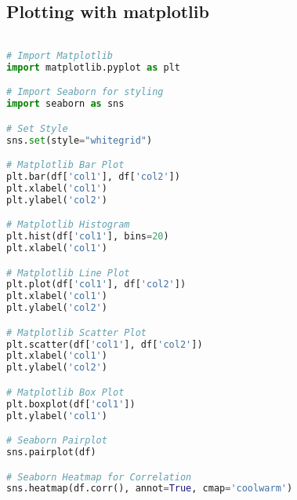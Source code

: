 \documentclass[english, threecolumn]{latex4ei/latex4ei_sheet}
\begin{document}
\begin{sectionbox}
\subsection{Plotting with matplotlib}
\begin{lstlisting}[language=Python, gobble=0]

# Import Matplotlib
import matplotlib.pyplot as plt

# Import Seaborn for styling
import seaborn as sns

# Set Style
sns.set(style="whitegrid")

# Matplotlib Bar Plot
plt.bar(df['col1'], df['col2'])
plt.xlabel('col1')
plt.ylabel('col2')

# Matplotlib Histogram
plt.hist(df['col1'], bins=20)
plt.xlabel('col1')

# Matplotlib Line Plot
plt.plot(df['col1'], df['col2'])
plt.xlabel('col1')
plt.ylabel('col2')

# Matplotlib Scatter Plot
plt.scatter(df['col1'], df['col2'])
plt.xlabel('col1')
plt.ylabel('col2')

# Matplotlib Box Plot
plt.boxplot(df['col1'])
plt.ylabel('col1')

# Seaborn Pairplot
sns.pairplot(df)

# Seaborn Heatmap for Correlation
sns.heatmap(df.corr(), annot=True, cmap='coolwarm')
\end{lstlisting}
\end{sectionbox}
\end{document}
